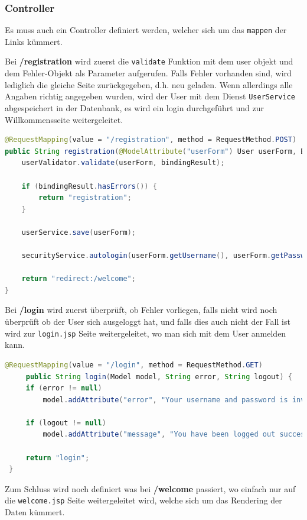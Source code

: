 \subsubsection{Controller}
Es muss auch ein Controller definiert werden, welcher sich um das \verb|mappen| der Links kümmert.

Bei \textbf{/registration} wird zuerst die \verb|validate| Funktion mit dem user objekt und dem Fehler-Objekt als Parameter aufgerufen. Falls Fehler vorhanden sind, wird lediglich die gleiche Seite zurückgegeben, d.h. neu geladen.
Wenn allerdings alle Angaben richtig angegeben wurden, wird der User mit dem Dienst \verb|UserService| abgespeichert in der Datenbank, es wird ein login durchgeführt und zur Willkommensseite weitergeleitet.

\begin{lstlisting}[language=Java]
@RequestMapping(value = "/registration", method = RequestMethod.POST)
public String registration(@ModelAttribute("userForm") User userForm, BindingResult bindingResult, Model model) {
	userValidator.validate(userForm, bindingResult);
	
	if (bindingResult.hasErrors()) {
		return "registration";
	}
	
	userService.save(userForm);
	
	securityService.autologin(userForm.getUsername(), userForm.getPasswordConfirm());
	
	return "redirect:/welcome";
}
	\end{lstlisting}
	
Bei \textbf{/login} wird zuerst überprüft, ob Fehler vorliegen, falls nicht wird noch überprüft ob der User sich ausgeloggt hat, und falls dies auch nicht der Fall ist wird zur \verb|login.jsp| Seite weitergeleitet, wo man sich mit dem User anmelden kann.

\begin{lstlisting}[language=Java]
 @RequestMapping(value = "/login", method = RequestMethod.GET)
	 public String login(Model model, String error, String logout) {
	 if (error != null)
		 model.addAttribute("error", "Your username and password is invalid.");
	 
	 if (logout != null)
		 model.addAttribute("message", "You have been logged out successfully.");
	 
	 return "login";
 }
	\end{lstlisting}
	
Zum Schluss wird noch definiert was bei \textbf{/welcome} passiert, wo einfach nur auf die \verb|welcome.jsp| Seite weitergeleitet wird, welche sich um das Rendering der Daten kümmert.

